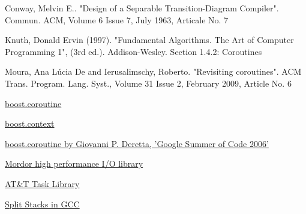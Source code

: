 \begin{thebibliography}{99}

        {Conway, Melvin E.. "Design of a Separable Transition-Diagram Compiler".
         Commun. ACM, Volume 6 Issue 7, July 1963, Articale No. 7}

        {Knuth, Donald Ervin (1997). "Fundamental Algorithms. The Art of Computer Programming 1", (3rd ed.).
         Addison-Wesley. Section 1.4.2: Coroutines}

        {Moura, Ana L\'{u}cia De and Ierusalimschy, Roberto. "Revisiting coroutines".
         ACM Trans. Program. Lang. Syst., Volume 31 Issue 2, February 2009, Article No. 6}

        \href{http://www.boost.org/doc/libs/1_53_0/libs/coroutine/doc/html/index.html}
        {boost.coroutine}

        \href{http://www.boost.org/doc/libs/1_53_0/libs/context/doc/html/index.html}
        {boost.context}

        \href{http://www.crystalclearsoftware.com/soc/coroutine/}
        {boost.coroutine by Giovanni P. Deretta, 'Google Summer of Code 2006'}

        \href{http://code.mozy.com/projects/mordor}
        {Mordor high performance I/O library}

        \href{http://www.softwarepreservation.org/projects/c_plus_plus/cfront/release_2.0/doc/LibraryManual.pdf}
        {AT\&T Task Library}

        \href{http://gcc.gnu.org/wiki/SplitStacks}
        {Split Stacks in GCC}

\end{thebibliography}

